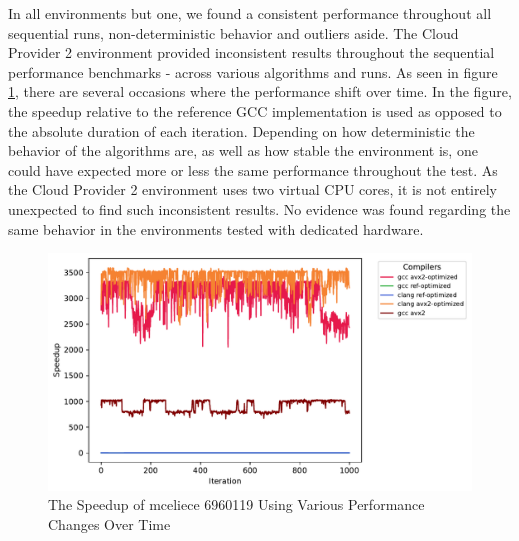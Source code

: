 

In all environments but one, we found a consistent performance throughout all sequential runs, non-deterministic behavior and outliers aside. The Cloud Provider 2 environment provided inconsistent results throughout the sequential performance benchmarks - across various algorithms and runs. As seen in figure \ref{figure:results:sequential:mceliece-decrpyt-cloud-provider-2}, there are several occasions where the performance shift over time. In the figure, the speedup relative to the reference GCC implementation is used as opposed to the absolute duration of each iteration. Depending on how deterministic the behavior of the algorithms are, as well as how stable the environment is, one could have expected more or less the same performance throughout the test. As the Cloud Provider 2 environment uses two virtual CPU cores, it is not entirely unexpected to find such inconsistent results. No evidence was found regarding the same behavior in the environments tested with dedicated hardware.

\begin{figure}
    \centering
    \includegraphics[scale=0.75]{chapters/results/sequential/mceliece_6960119_decrypt_Cloud Provider 2.pdf}
    \caption{The Speedup of \gls{mceliece} 6960119 Using Various Performance Changes Over Time}
    \label{figure:results:sequential:mceliece-decrpyt-cloud-provider-2}
\end{figure}



